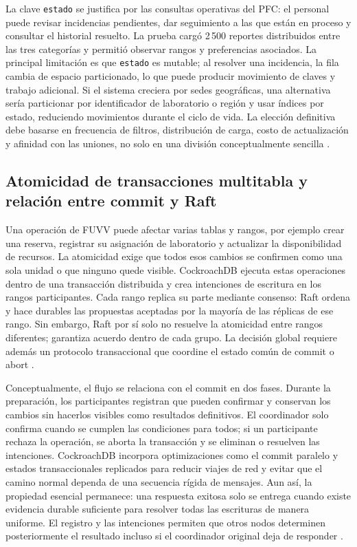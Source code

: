 \documentclass[12pt,a4paper]{article}
\begin{document}
La clave \texttt{estado} se justifica por las consultas operativas del PFC: el personal puede revisar incidencias pendientes, dar seguimiento a las que están en proceso y consultar el historial resuelto. La prueba cargó 2\,500 reportes distribuidos entre las tres categorías y permitió observar rangos y preferencias asociados. La principal limitación es que \texttt{estado} es mutable; al resolver una incidencia, la fila cambia de espacio particionado, lo que puede producir movimiento de claves y trabajo adicional. Si el sistema creciera por sedes geográficas, una alternativa sería particionar por identificador de laboratorio o región y usar índices por estado, reduciendo movimientos durante el ciclo de vida. La elección definitiva debe basarse en frecuencia de filtros, distribución de carga, costo de actualización y afinidad con las uniones, no solo en una división conceptualmente sencilla \cite{danach2024fragmentation,schafer2020benchmarking}.

\subsection{Atomicidad de transacciones multitabla y relación entre commit y Raft}

Una operación de FUVV puede afectar varias tablas y rangos, por ejemplo crear una reserva, registrar su asignación de laboratorio y actualizar la disponibilidad de recursos. La atomicidad exige que todos esos cambios se confirmen como una sola unidad o que ninguno quede visible. CockroachDB ejecuta estas operaciones dentro de una transacción distribuida y crea intenciones de escritura en los rangos participantes. Cada rango replica su parte mediante consenso: Raft ordena y hace durables las propuestas aceptadas por la mayoría de las réplicas de ese rango. Sin embargo, Raft por sí solo no resuelve la atomicidad entre rangos diferentes; garantiza acuerdo dentro de cada grupo. La decisión global requiere además un protocolo transaccional que coordine el estado común de commit o abort \cite{taft2020cockroachdb,deheus2022transactions}.

Conceptualmente, el flujo se relaciona con el commit en dos fases. Durante la preparación, los participantes registran que pueden confirmar y conservan los cambios sin hacerlos visibles como resultados definitivos. El coordinador solo confirma cuando se cumplen las condiciones para todos; si un participante rechaza la operación, se aborta la transacción y se eliminan o resuelven las intenciones. CockroachDB incorpora optimizaciones como el commit paralelo y estados transaccionales replicados para reducir viajes de red y evitar que el camino normal dependa de una secuencia rígida de mensajes. Aun así, la propiedad esencial permanece: una respuesta exitosa solo se entrega cuando existe evidencia durable suficiente para resolver todas las escrituras de manera uniforme. El registro y las intenciones permiten que otros nodos determinen posteriormente el resultado incluso si el coordinador original deja de responder \cite{taft2020cockroachdb,gupta2020agreement}.
\end{document}
